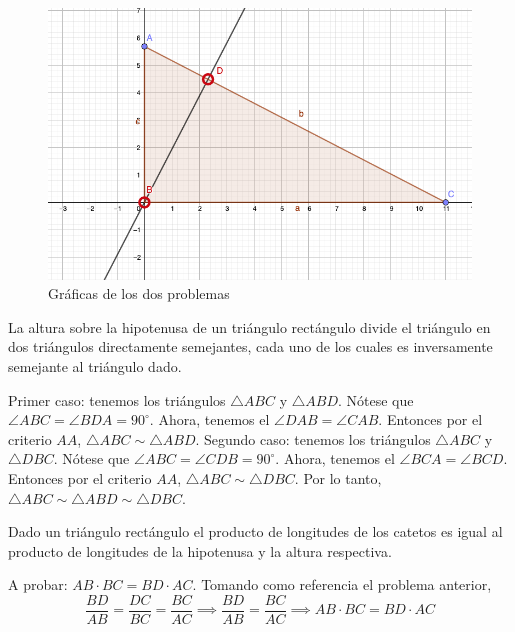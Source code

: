 





\begin{figure}[H]
	\centering
	\includegraphics[scale=0.5]{Images/1}
	\caption{Gráficas de los dos problemas}
\end{figure}

\begin{problema}
	La altura sobre la hipotenusa de un triángulo rectángulo divide el triángulo en dos triángulos directamente semejantes, cada uno de los cuales es inversamente semejante al triángulo dado. 
\end{problema}
\begin{dem}
	
	Primer caso: tenemos los triángulos $\triangle ABC$ y $\triangle ABD$. Nótese que $\angle ABC=\angle BDA=90^\circ$. Ahora, tenemos el $\angle DAB=\angle CAB$. Entonces por el criterio $AA$, $\triangle ABC\sim \triangle ABD$. Segundo caso: tenemos los triángulos $\triangle ABC$ y $\triangle DBC$. Nótese que $\angle ABC=\angle CDB=90^\circ$. Ahora, tenemos el $\angle BCA=\angle BCD$. Entonces por el criterio $AA$, $\triangle ABC\sim \triangle  DBC$. Por lo tanto, $\triangle ABC \sim \triangle ABD \sim \triangle DBC$.
\end{dem}

\begin{problema}
	Dado un triángulo rectángulo el producto de longitudes de los catetos es igual al producto de longitudes de la hipotenusa y la altura respectiva.
\end{problema}
\begin{dem}
	A probar: $AB\cdot BC= BD\cdot AC$. Tomando como referencia el problema anterior, 
	$$\frac{BD}{AB}=\frac{DC}{BC}=\frac{BC}{AC}\implies \frac{BD}{AB}=\frac{BC}{AC}\implies AB\cdot BC= BD\cdot AC $$
\end{dem}








